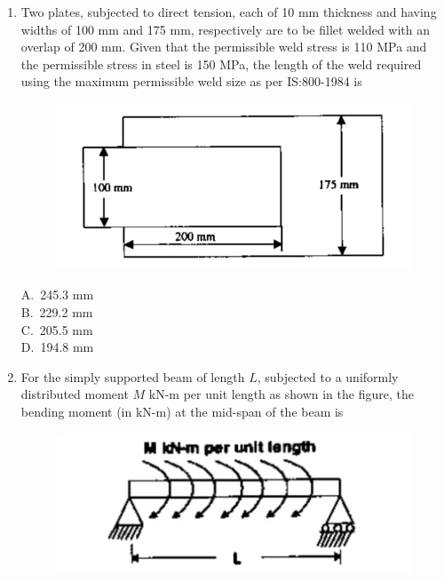 \documentclass[journal,12pt,onecolumn]{IEEEtran}
\theoremstyle{remark}
\begin{document}
\begin{enumerate}
\begin{multicols}{4}
A.\ 1083.6 kN \\
B.\ 871.32 kN \\
C.\ 541.8 kN \\
D.\ 433.7 kN
\end{multicols}

\noindent\item Two plates, subjected to direct tension, each of 10 mm thickness and having widths of 100 mm and 175 mm, respectively are to be fillet welded with an overlap of 200 mm. Given that the permissible weld stress is 110 MPa and the permissible stress in steel is 150 MPa, the length of the weld required using the maximum permissible weld size as per IS:800-1984 is \hfill{}

\begin{figure}[H]
     \centering
     \includegraphics[scale=0.5]{figs/47c2880c-f6f6-44c0-8945-4aa142a40d60.jpg} 
     \caption{}
     \label{fig:figure4}
 \end{figure}
 
\begin{multicols}{4}
A.\ 245.3 mm \\
B.\ 229.2 mm \\
C.\ 205.5 mm \\
D.\ 194.8 mm
\end{multicols}

\noindent\item For the simply supported beam of length $L$, subjected to a uniformly distributed moment $M$ kN-m per unit length as shown in the figure, the bending moment (in kN-m) at the mid-span of the beam is
\hfill{}

\begin{figure}[H]
     \centering
     \includegraphics[scale=0.55]{figs/3d041fea-5713-4739-aa3e-a69aaeca9879.jpg} 
     \caption{}
     \label{fig:figure5}
 \end{figure}
 

\end{enumerate}
\end{document}
